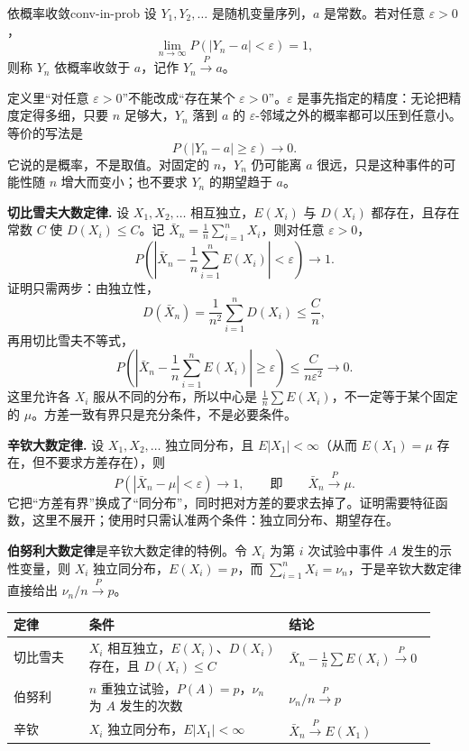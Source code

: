 \begin{mydef}{依概率收敛}{conv-in-prob}
设 $Y_1,Y_2,\dots$ 是随机变量序列，$a$ 是常数。若对任意 $\varepsilon>0$，
\[
\lim_{n\to\infty}P(|Y_n-a|<\varepsilon)=1,
\]
则称 $Y_n$ 依概率收敛于 $a$，记作 $Y_n\overset{P}{\longrightarrow}a$。
\end{mydef}

定义里“对任意 $\varepsilon>0$”不能改成“存在某个 $\varepsilon>0$”。$\varepsilon$ 是事先指定的精度：无论把精度定得多细，只要 $n$ 足够大，$Y_n$ 落到 $a$ 的 $\varepsilon$-邻域之外的概率都可以压到任意小。等价的写法是
\[
P(|Y_n-a|\ge\varepsilon)\longrightarrow0.
\]
它说的是概率，不是取值。对固定的 $n$，$Y_n$ 仍可能离 $a$ 很远，只是这种事件的可能性随 $n$ 增大而变小；也不要求 $Y_n$ 的期望趋于 $a$。

\textbf{切比雪夫大数定律.} 设 $X_1,X_2,\dots$ 相互独立，$E(X_i)$ 与 $D(X_i)$ 都存在，且存在常数 $C$ 使 $D(X_i)\le C$。记 $\bar X_n=\frac1n\sum_{i=1}^n X_i$，则对任意 $\varepsilon>0$，
\[
P\!\left(\left|\bar X_n-\frac1n\sum_{i=1}^n E(X_i)\right|<\varepsilon\right)\longrightarrow1.
\]
证明只需两步：由独立性，
\[
D(\bar X_n)=\frac{1}{n^2}\sum_{i=1}^n D(X_i)\le\frac{C}{n},
\]
再用切比雪夫不等式，
\[
P\!\left(\left|\bar X_n-\frac1n\sum_{i=1}^n E(X_i)\right|\ge\varepsilon\right)
\le\frac{C}{n\varepsilon^2}\longrightarrow0.
\]
这里允许各 $X_i$ 服从不同的分布，所以中心是 $\frac1n\sum E(X_i)$，不一定等于某个固定的 $\mu$。方差一致有界只是充分条件，不是必要条件。

\textbf{辛钦大数定律.} 设 $X_1,X_2,\dots$ 独立同分布，且 $E|X_1|<\infty$（从而 $E(X_1)=\mu$ 存在，但不要求方差存在），则
\[
P(|\bar X_n-\mu|<\varepsilon)\longrightarrow1,
\qquad\text{即}\qquad
\bar X_n\overset{P}{\longrightarrow}\mu.
\]
它把“方差有界”换成了“同分布”，同时把对方差的要求去掉了。证明需要特征函数，这里不展开；使用时只需认准两个条件：独立同分布、期望存在。

\textbf{伯努利大数定律}是辛钦大数定律的特例。令 $X_i$ 为第 $i$ 次试验中事件 $A$ 发生的示性变量，则 $X_i$ 独立同分布，$E(X_i)=p$，而 $\sum_{i=1}^n X_i=\nu_n$，于是辛钦大数定律直接给出 $\nu_n/n\overset{P}{\longrightarrow}p$。

\begin{center}
\begin{tabular}{@{}p{0.17\linewidth}p{0.45\linewidth}p{0.31\linewidth}@{}}
\toprule
定律 & 条件 & 结论 \\
\midrule
切比雪夫 & $X_i$ 相互独立，$E(X_i)$、$D(X_i)$ 存在，且 $D(X_i)\le C$ & $\bar X_n-\frac1n\sum E(X_i)\overset{P}{\longrightarrow}0$ \\[4pt]
伯努利 & $n$ 重独立试验，$P(A)=p$，$\nu_n$ 为 $A$ 发生的次数 & $\nu_n/n\overset{P}{\longrightarrow}p$ \\[4pt]
辛钦 & $X_i$ 独立同分布，$E|X_1|<\infty$ & $\bar X_n\overset{P}{\longrightarrow}E(X_1)$ \\
\bottomrule
\end{tabular}
\end{center}

